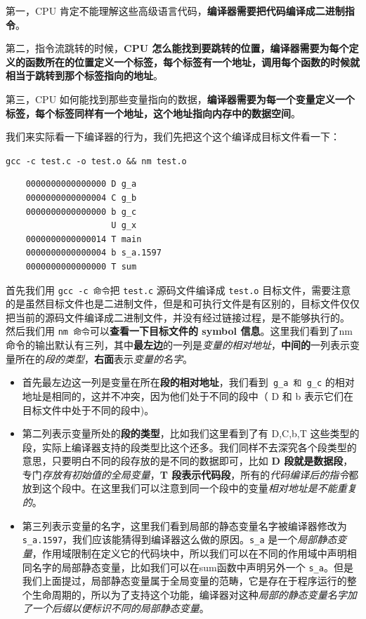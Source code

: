 \documentclass[UTF8,a4paper,12pt]{ctexbook}
\begin{document}
				第一，CPU 肯定不能理解这些高级语言代码，\textbf{编译器需要把代码编译成二进制指令}。 
				
				第二，指令流跳转的时候，\textbf{CPU 怎么能找到要跳转的位置，编译器需要为每个定义的函数所在的位置定义一个标签，每个标签有一个地址，调用每个函数的时候就相当于跳转到那个标签指向的地址}。 
				
				第三，CPU 如何能找到那些变量指向的数据，\textbf{编译器需要为每一个变量定义一个标签，每个标签同样有一个地址，这个地址指向内存中的数据空间}。
			
				我们来实际看一下编译器的行为，我们先把这个这个编译成目标文件看一下：
				
				\verb|gcc -c test.c -o test.o && nm test.o|
				\begin{lstlisting}
	0000000000000000 D g_a
	0000000000000004 C g_b
	0000000000000000 b g_c
					 U g_x
	0000000000000014 T main
	0000000000000004 b s_a.1597
	0000000000000000 T sum
				\end{lstlisting}
				
				
				首先我们用 \verb|gcc -c 命令|把 \verb|test.c| 源码文件编译成 \verb|test.o| 目标文件，需要注意的是虽然目标文件也是二进制文件，但是和可执行文件是有区别的，目标文件仅仅把当前的源码文件编译成二进制文件，并没有经过链接过程，是不能够执行的。
				然后我们用 \verb|nm 命令|可以\textbf{查看一下目标文件的 symbol 信息}。这里我们看到了nm命令的输出默认有三列，其中\textbf{最左边}的一列是\textit{变量的相对地址}，\textbf{中间的}一列表示变量所在的\textit{段的类型}，\textbf{右面}表示\textit{变量的名字}。
				
				\begin{itemize}
					\item 首先最左边这一列是变量在所在\textbf{段的相对地址}，我们看到\verb| g_a 和 g_c| 的相对地址是相同的，这并不冲突，因为他们处于不同的段中（ D 和 b 表示它们在目标文件中处于不同的段中)。
					\item 第二列表示变量所处的\textbf{段的类型}，比如我们这里看到了有 D,C,b,T 这些类型的段，实际上编译器支持的段类型比这个还多。我们同样不去深究各个段类型的意思，只要明白不同的段存放的是不同的数据即可，比如 \textbf{D 段就是数据段}，专门\textit{存放有初始值的全局变量}，\textbf{T 段表示代码段}，所有的\textit{代码编译后的指令}都放到这个段中。在这里我们可以注意到同一个段中的变量\textit{相对地址是不能重复的}。
					\item 第三列表示变量的名字，这里我们看到局部的静态变量名字被编译器修改为 \verb|s_a.1597|，我们应该能猜得到编译器这么做的原因。\verb|s_a| 是一个\textit{局部静态变量}，作用域限制在定义它的代码块中，所以我们可以在不同的作用域中声明相同名字的局部静态变量，比如我们可以在sum函数中声明另外一个 \verb|s_a|。但是我们上面提过，局部静态变量属于全局变量的范畴，它是存在于程序运行的整个生命周期的，所以为了支持这个功能，编译器对这种\textit{局部的静态变量名字加了一个后缀以便标识不同的局部静态变量}。
				\end{itemize}
				
\end{document}
